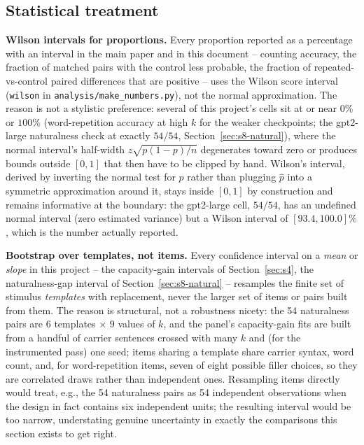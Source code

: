 \documentclass[11pt]{article}
\begin{document}
\subsection{Statistical treatment}
\label{sec:s8-stats}

\textbf{Wilson intervals for proportions.} Every proportion reported as a
percentage with an interval in the main paper and in this document -- counting
accuracy, the fraction of matched pairs with the control less probable, the
fraction of repeated-vs-control paired differences that are positive -- uses
the Wilson score interval (\texttt{wilson} in
\texttt{analysis/make\_numbers.py}), not the normal approximation. The reason
is not a stylistic preference: several of this project's cells sit at or near
$0\%$ or $100\%$ (word-repetition accuracy at high $k$ for the weaker
checkpoints; the gpt2-large naturalness check at exactly $54/54$,
Section~\ref{sec:s8-natural}), where the normal interval's half-width
$z\sqrt{p(1-p)/n}$ degenerates toward zero or produces bounds outside
$[0,1]$ that then have to be clipped by hand. Wilson's interval, derived by
inverting the normal test for $p$ rather than plugging $\hat p$ into a
symmetric approximation around it, stays inside $[0,1]$ by construction and
remains informative at the boundary: the gpt2-large cell, $54/54$, has an
undefined normal interval (zero estimated variance) but a Wilson interval of
$[93.4,100.0]\%$, which is the number actually reported.

\textbf{Bootstrap over templates, not items.} Every confidence interval on a
\emph{mean} or \emph{slope} in this project -- the capacity-gain intervals of
Section~\ref{sec:s4}, the naturalness-gap interval of
Section~\ref{sec:s8-natural} -- resamples the finite set of stimulus
\emph{templates} with replacement, never the larger set of items or pairs
built from them. The reason is structural, not a robustness nicety: the 54
naturalness pairs are $6$ templates $\times$ $9$ values of $k$, and the
panel's capacity-gain fits are built from a handful of carrier sentences
crossed with many $k$ and (for the instrumented pass) one seed; items sharing
a template share carrier syntax, word count, and, for word-repetition items,
seven of eight possible filler choices, so they are correlated draws rather
than independent ones. Resampling items directly would treat, e.g., the 54
naturalness pairs as 54 independent observations when the design in fact
contains six independent units; the resulting interval would be too narrow,
understating genuine uncertainty in exactly the comparisons this section
exists to get right.
\end{document}
